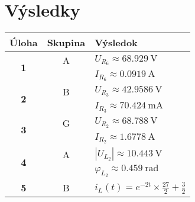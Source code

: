 \section{Výsledky}

\begin{tabularx}{\textwidth}{|c|c|X|}
	\hline
	\textbf{Úloha} & \textbf{Skupina} & \textbf{Výsledok} \\
	\hline
	\multirow{2}{*}{\textbf{1}} &A & $U_{R_{6}} \approx \SI{68.929}{\volt}$ \\
	& & $I_{R_{6}} \approx \SI{0.0919}{\ampere}$ \\
	\hline
	\multirow{2}{*}{\textbf{2}} &B & $U_{R_{3}} \approx \SI{42.9586}{\volt}$ \\
	& & $I_{R_{3}} \approx \SI{70.424}{\milli \ampere}$ \\
	\hline
	\multirow{2}{*}{\textbf{3}} &G & $U_{R_{2}} \approx \SI{68.788}{\volt}$ \\
	& & $I_{R_{2}} \approx \SI{1.6778}{\ampere}$ \\
	\hline
	\multirow{2}{*}{\textbf{4}} &A & $|U_{L_{2}}| \approx \SI{10.443}{\volt}$ \\
	& & $\varphi_{L_{2}} \approx \SI{0.459}{\radian}$ \\
	\hline
    \textbf{5} &B & $i_L(t)=e^{-2t} \times \frac{27}{2} + \frac{3}{2}$ \\
	\hline
\end{tabularx}